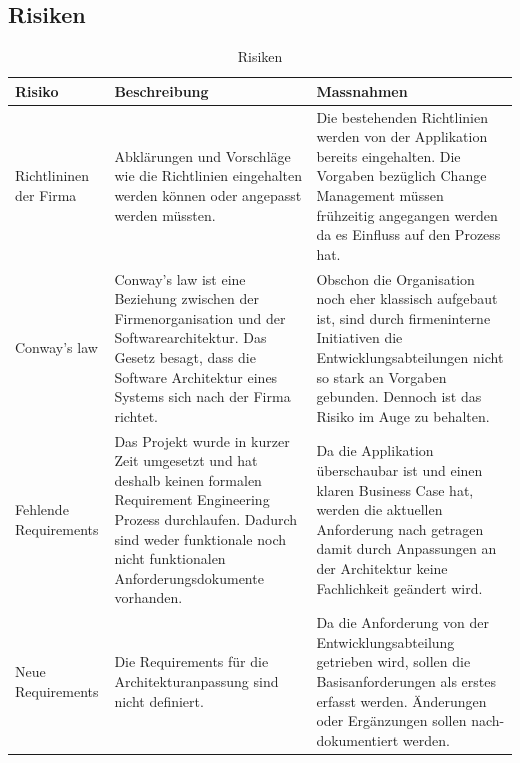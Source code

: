 \begin{landscape}
\section{Risiken}
\begin{table}[h!]
	\centering
	\caption{Risiken}
	\begin{tabular}{ | p{2cm} | p{10cm} | p{10cm} | }
		\toprule
		{\textbf{Risiko}} & {\textbf{Beschreibung}} & {\textbf{Massnahmen}} \\
		\midrule
		Richtlininen der Firma & Abklärungen und Vorschläge wie die Richtlinien eingehalten werden können oder angepasst werden müssten. & Die bestehenden Richtlinien werden von der Applikation bereits eingehalten. Die Vorgaben bezüglich Change Management müssen frühzeitig angegangen werden da es Einfluss auf den Prozess hat. \\ \hline
		Conway's law & Conway's law ist eine Beziehung zwischen der Firmenorganisation und der Softwarearchitektur. Das Gesetz besagt, dass die Software Architektur eines Systems sich nach der Firma richtet. & Obschon die Organisation noch eher klassisch aufgebaut ist, sind durch firmeninterne Initiativen die Entwicklungsabteilungen nicht so stark an Vorgaben gebunden. Dennoch ist das Risiko im Auge zu behalten. \\ \hline
		Fehlende Requirements & Das Projekt wurde in kurzer Zeit umgesetzt und hat deshalb keinen formalen Requirement Engineering Prozess durchlaufen. Dadurch sind weder funktionale noch nicht funktionalen Anforderungsdokumente vorhanden. &  Da die Applikation überschaubar ist und einen klaren Business Case hat, werden die aktuellen Anforderung nach getragen damit durch Anpassungen an der Architektur keine Fachlichkeit geändert wird. \\ \hline
		Neue Requirements & Die Requirements für die Architekturanpassung sind nicht definiert. & Da die Anforderung von der Entwicklungsabteilung getrieben wird, sollen die Basisanforderungen als erstes erfasst werden. Änderungen oder Ergänzungen sollen nach-dokumentiert werden.\\
		\bottomrule
	\end{tabular}
\end{table}

\end{landscape}
\restoregeometry